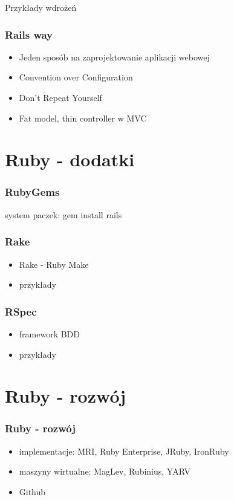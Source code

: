 \documentclass[12t]{beamer}
\begin{document}
\begin{frame}
  Przykłady wdrożeń
\end{frame}

\begin{frame}
  \frametitle{Rails way}
  \begin{itemize}
  \item Jeden sposób na zaprojektowanie aplikacji webowej
  \item Convention over Configuration
  \item Don't Repeat Yourself
  \item Fat model, thin controller w MVC
  \end{itemize}
\end{frame}

\section{Ruby - dodatki}
\begin{frame}
  \frametitle{RubyGems}
  system paczek: gem install rails
\end{frame}

\begin{frame}
  \frametitle{Rake}
  \begin{itemize}
  \item Rake - Ruby Make
  \item przykłady
  \end{itemize}
\end{frame}

\begin{frame}
  \frametitle{RSpec}
  \begin{itemize}
  \item framework BDD
  \item przykłady
  \end{itemize}
\end{frame}

\section{Ruby - rozwój}
\begin{frame}
  \frametitle{Ruby - rozwój}
  \begin{itemize}
  \item implementacje: MRI, Ruby Enterprise, JRuby, IronRuby
  \item maszyny wirtualne: MagLev, Rubinius, YARV
  \item Github
  \end{itemize}
\end{frame}
\end{document}
